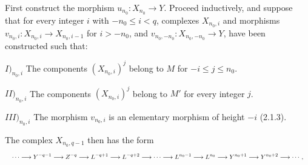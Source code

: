 First construct the morphism $u_{n_0}\colon X_{n_0}\longrightarrow Y$.
Proceed inductively, and suppose that for every integer $i$ with
$-n_0\leq i<q$, complexes $X_{n_0,i}$ and morphisms
$v_{n_0,i}\colon X_{n_0,i}\longrightarrow X_{n_0,i-1}$ for $i>-n_0$, and
$v_{n_0,-n_0}\colon X_{n_0,-n_0}\longrightarrow Y$, have been constructed
such that:

\noindent $I)_{n_0,i}$ The components $(X_{n_0,i})^j$ belong to $M$ for
$-i\leq j\leq n_0$.

\noindent $II)_{n_0,i}$ The components $(X_{n_0,i})^j$ belong to $M'$ for
every integer $j$.

\noindent $III)_{n_0,i}$ The morphism $v_{n_0,i}$ is an elementary morphism
of height $-i$ (2.1.3).

The complex $X_{n_0,q-1}$ then has the form
\[
\resizebox{\textwidth}{!}{$\displaystyle
\cdots\longrightarrow Y^{-q-1}\longrightarrow Z^{-q}
\longrightarrow L^{-q+1}\longrightarrow L^{-q+2}\longrightarrow\cdots
\longrightarrow L^{n_0-1}\longrightarrow L^{n_0}
\longrightarrow Y^{n_0+1}\longrightarrow Y^{n_0+2}\longrightarrow\cdots,
$}
\]
\endgroup
